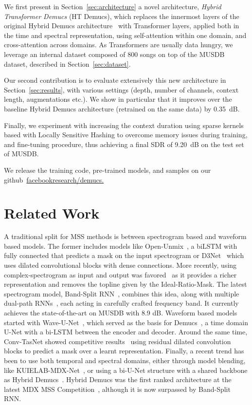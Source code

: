 \documentclass{article}
\begin{document}
We first present in Section~\ref{sec:architecture} a novel architecture, \emph{Hybrid Transformer Demucs} (HT Demucs), which replaces the innermost layers of the original Hybrid Demucs architecture~\cite{defossez2021hybrid} with Transformer layers, applied both in the time and spectral
representation, using self-attention within one domain, and cross-attention across domains.
As Transformers are usually data hungry, we leverage an internal dataset composed of 800 songs on top of the MUSDB dataset, described in Section~\ref{sec:dataset}. 

Our second contribution is to evaluate extensively this new architecture in Section~\ref{sec:results}, with various settings (depth, number of channels, context length, augmentations etc.). We show in particular that it improves over the baseline Hybrid Demucs architecture (retrained on the same data) by 0.35~dB. 

Finally, we experiment with increasing the context duration using sparse kernels based with Locally Sensitive Hashing
to overcome memory issues during training, and fine-tuning procedure, thus achieving a final SDR of 9.20~dB on the test set of MUSDB. 

We release the training code, pre-trained models, and samples on our github~\href{https://github.com/facebookresearch/demucs}{facebookresearch/demucs.}





\section{Related Work}
\label{sec:related}

A traditional split for MSS methods is between spectrogram based and waveform based models.
The former includes models like Open-Unmix~\cite{umx}, a biLSTM with fully connected that
predicts a mask on the input spectrogram or D3Net~\cite{d3net} which uses dilated convolutional blocks with dense connections. More recently, using complex-spectrogram as input and output was favored~\cite{lasaft} as it provides a richer representation and removes the topline given by the Ideal-Ratio-Mask.
The latest spectrogram model, Band-Split RNN~\cite{bsrnn}, combines this idea, along with multiple
dual-path RNNs~\cite{luo2020dual}, each acting in carefully crafted frequency band. 
It currently achieves the state-of-the-art on MUSDB with 8.9 dB.
Waveform based models started with Wave-U-Net~\cite{waveunet}, which served as the basis for Demucs~\cite{demucsv2}, a 
time domain U-Net with a bi-LSTM between the encoder and decoder. Around the same time, Conv-TasNet
showed competitive results~\cite{convtasnet,demucsv2} using residual dilated convolution blocks to predict
a mask over a learnt representation. Finally, a recent trend has been to use both temporal and spectral domains, either through model blending, like KUIELAB-MDX-Net~\cite{kuielab}, or using
a bi-U-Net structure with a shared backbone as Hybrid Demucs~\cite{defossez2021hybrid}. Hybrid Demucs
was the first ranked architecture at the latest MDX MSS Competition~\cite{mdx2021}, although
it is now surpassed by Band-Split RNN.
\end{document}
